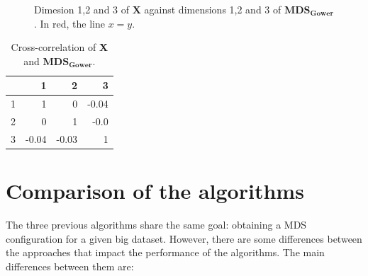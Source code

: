 \documentclass[11pt]{report}
\begin{document}
\begin{figure}[ht]
    \centering
    \caption{Dimesion 1,2 and 3 of \textbf{X} against dimensions 1,2 and 3 of  $\mathbf{MDS_{Gower}}$. \newline
            In red, the line $x=y$.}%
    \label{gower_example}%
\end{figure}


\begin{table}[ht]
\centering
\begin{tabular}{rrrr}
  \hline
 & 1 & 2 & 3 \\ 
  \hline
  1 & 1 & 0 & -0.04 \\ 
  2 & 0 & 1 & -0.0 \\ 
  3 & -0.04 & -0.03 & 1 \\ 
   \hline
\end{tabular}
\caption{Cross-correlation of \textbf{X} and $\mathbf{MDS_{Gower}}$.} 
\label{corr_gower}
\end{table}


\section{Comparison of the algorithms}
\indent The three previous algorithms share the same goal: obtaining a MDS 
configuration for a given big dataset. However, there are some differences 
between the approaches that impact the performance of the algorithms. 
The main differences between them are:
\end{document}
